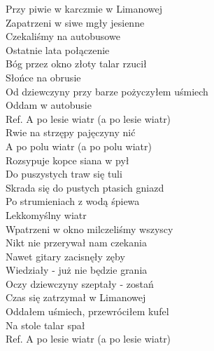 
\begin{flushleft}
Przy piwie w karczmie w Limanowej \tab{}\\
Zapatrzeni w siwe mgły jesienne\tab{}\\
Czekaliśmy na autobusowe \tab{}\tab{}\\
Ostatnie lata połączenie\tab{} \tab{}\\
Bóg przez okno złoty talar rzucił \tab{}\\
Słońce na obrusie \tab{}\tab{}\\
Od dziewczyny przy barze pożyczyłem uśmiech \\
Oddam w autobusie \tab{}\tab{}\\
\vskip 3mm
Ref. A po lesie wiatr (a po lesie wiatr)  \\
\hspace{0.9cm}Rwie na strzępy pajęczyny nić  \\
\hspace{0.9cm}A po polu wiatr (a po polu wiatr)  \\
\hspace{0.9cm}Rozsypuje kopce siana w pył  \\
\hspace{0.9cm}Do puszystych traw się tuli  \\
\hspace{0.9cm}Skrada się do pustych ptasich gniazd   \\
\hspace{0.9cm}Po strumieniach z wodą śpiewa  \\
\hspace{0.9cm}Lekkomyślny wiatr \tab{}\\
\vskip 3mm
Wpatrzeni w okno milczeliśmy wszyscy \\
Nikt nie przerywał nam czekania \\
Nawet gitary zacisnęły zęby \\
Wiedziały - już nie będzie grania \\
Oczy dziewczyny szeptały - zostań \\
Czas się zatrzymał w Limanowej \\
Oddałem uśmiech, przewróciłem kufel \\
Na stole talar spał \\
\vskip 3mm
Ref. A po lesie wiatr (a po lesie wiatr) \\

\end{flushleft}
